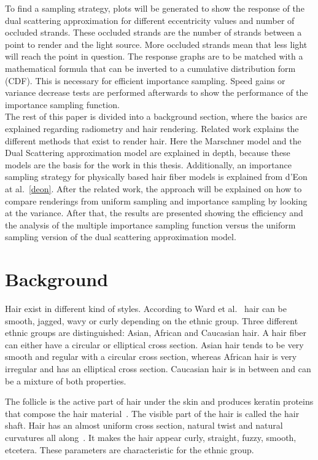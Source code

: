 \documentclass[11pt,a4paper]{report}
\begin{document}
To find a sampling strategy, plots will be generated to show the response of the dual scattering approximation for different eccentricity values and number of occluded strands. These occluded strands are the number of strands between a point to render and the light source. More occluded strands mean that less light will reach the point in question. The response graphs are to be matched with a mathematical formula that can be inverted to a cumulative distribution form (CDF). This is necessary for efficient importance sampling. Speed gains or variance decrease tests are performed afterwards to show the performance of the importance sampling function.\\

The rest of this paper is divided into a background section, where the basics are explained regarding radiometry and hair rendering. Related work explains the different methods that exist to render hair. Here the Marschner model and the Dual Scattering approximation model are explained in depth, because these models are the basis for the work in this thesis. Additionally, an importance sampling strategy for physically based hair fiber models is explained from d'Eon at al.~\ref{deon}. After the related work, the approach will be explained on how to compare renderings from uniform sampling and importance sampling by looking at the variance. After that, the results are presented showing the efficiency and the analysis of the multiple importance sampling function versus the uniform sampling version of the dual scattering approximation model.

%
%

\chapter{Background}

Hair exist in different kind of styles. According to Ward et al.~\cite{ward} hair can be smooth, jagged, wavy or curly depending on the ethnic group. Three different ethnic groups are distinguished: Asian, African and Caucasian hair. A hair fiber can either have a circular or elliptical cross section. Asian hair tends to be very smooth and regular with a circular cross section, whereas African hair is very irregular and has an elliptical cross section. Caucasian hair is in between and can be a mixture of both properties.

The follicle is the active part of hair under the skin and produces keratin proteins that compose the hair material~\cite{hadap}. The visible part of the hair is called the hair shaft. Hair has an almost uniform cross section, natural twist and natural curvatures all along~\cite{hadap}. It makes the hair appear curly, straight, fuzzy, smooth, etcetera. These parameters are characteristic for the ethnic group.
\end{document}
